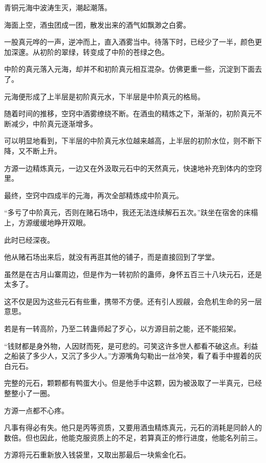 
\begin{this_body}



青铜元海中波涛生灭，潮起潮落。

海面上空，酒虫团成一团，散发出来的酒气如飘渺之白雾。

一股真元哗的一声，逆冲而上，直入酒雾当中。待落下时，已经少了一半，颜色更加深邃。从初阶的翠绿，转变成了中阶的苍绿之色。

中阶的真元落入元海，却并不和初阶真元相互混杂。仿佛更重一些，沉淀到下面去了。

元海便形成了上半层是初阶真元水，下半层是中阶真元的格局。

随着时间的推移，空窍中酒雾缭绕不断。在酒虫的精炼之下，渐渐的，初阶真元不断减少，中阶真元逐渐增多。

可以明显地看到，下半层的中阶真元水位越来越高，上半层的初阶水位，则不断下降，又不断上升。

方源一边精炼真元，一边又在外汲取元石中的天然真元，快速地补充到体内的空窍里。

最终，空窍中四成半的元海，再次全部精炼成中阶真元。

“多亏了中阶真元，否则在赌石场中，我还无法连续解石五次。”趺坐在宿舍的床榻上，方源缓缓地睁开双眼。

此时已经深夜。

他从赌石场出来后，就没有再逛其他的铺子，而是直接回到了学堂。

虽然是在古月山寨周边，但是作为一转初阶的蛊师，身怀五百三十八块元石，还是太多了。

这不仅是因为这些元石有些重，携带不方便。还有引人觊觎，会危机生命的另一层意思。

若是有一转高阶，乃至二转蛊师起了歹心，以方源目前之能，还不能招架。

“钱财都是身外物，人因财而死，是可悲的。可笑这许多世人都看不破这点。利益之船装了多少人，又沉了多少人。”方源嘴角勾勒出一丝冷笑，看了看手中握着的灰白元石。

完整的元石，颗颗都有鸭蛋大小。但是他手中这颗，因为被汲取了一半真元，已经整整小了一圈。

方源一点都不心疼。

凡事有得必有失。他只是丙等资质，又要用酒虫精炼真元，元石的消耗是同龄人的数倍。但也因此，他能克服资质上的不足，若算真正的修行进度，他能名列前三。

方源将元石重新放入钱袋里，又取出那最后一块紫金化石。


\end{this_body}
